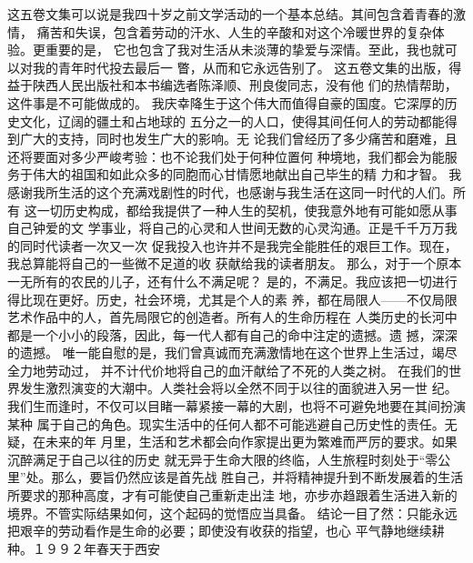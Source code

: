  这五卷文集可以说是我四十岁之前文学活动的一个基本总结。其间包含着青春的激情，
 痛苦和失误，包含着劳动的汗水、人生的辛酸和对这个冷暖世界的复杂体验。更重要的是，
 它也包含了我对生活从未淡薄的挚爱与深情。至此，我也就可以对我的青年时代投去最后一
 瞥，从而和它永远告别了。
 这五卷文集的出版，得益于陕西人民出版社和本书编选者陈泽顺、刑良俊同志，没有他
 们的热情帮助，这件事是不可能做成的。
 我庆幸降生于这个伟大而值得自豪的国度。它深厚的历史文化，辽阔的疆土和占地球的
 五分之一的人口，使得其间任何人的劳动都能得到广大的支持，同时也发生广大的影响。无
 论我们曾经历了多少痛苦和磨难，且还将要面对多少严峻考验：也不论我们处于何种位置何
 种境地，我们都会为能服务于伟大的祖国和如此众多的同胞而心甘情愿地献出自己毕生的精
 力和才智。
 我感谢我所生活的这个充满戏剧性的时代，也感谢与我生活在这同一时代的人们。所有
 这一切历史构成，都给我提供了一种人生的契机，使我意外地有可能如愿从事自己钟爱的文
 学事业，将自己的心灵和人世间无数的心灵沟通。正是千千万万我的同时代读者一次又一次
 促我投入也许并不是我完全能胜任的艰巨工作。现在，我总算能将自己的一些微不足道的收
 获献给我的读者朋友。
 那么，对于一个原本一无所有的农民的儿子，还有什么不满足呢？
 是的，不满足。我应该把一切进行得比现在更好。历史，社会环境，尤其是个人的素
 养，都在局限人——不仅局限艺术作品中的人，首先局限它的创造者。所有人的生命历程在
 人类历史的长河中都是一个小小的段落，因此，每一代人都有自己的命中注定的遗撼。遗
 撼，深深的遗撼。
 唯一能自慰的是，我们曾真诚而充满激情地在这个世界上生活过，竭尽全力地劳动过，
 并不计代价地将自己的血汗献给了不死的人类之树。
 在我们的世界发生激烈演变的大潮中。人类社会将以全然不同于以往的面貌进入另一世
 纪。我们生而逢时，不仅可以目睹一幕紧接一幕的大剧，也将不可避免地要在其间扮演某种
 属于自己的角色。现实生活中的任何人都不可能逃避自己历史性的责任。无疑，在未来的年
 月里，生活和艺术都会向作家提出更为繁难而严厉的要求。如果沉醉满足于自己以往的历史
 就无异于生命大限的终临，人生旅程时刻处于“零公里”处。那么，要旨仍然应该是首先战
 胜自己，并将精神提升到不断发展着的生活所要求的那种高度，才有可能使自己重新走出洼
 地，亦步亦趋跟着生活进入新的境界。不管实际结果如何，这个起码的觉悟应当具备。
 结论一目了然：只能永远把艰辛的劳动看作是生命的必要；即使没有收获的指望，也心
 平气静地继续耕种。１９９２年春天于西安